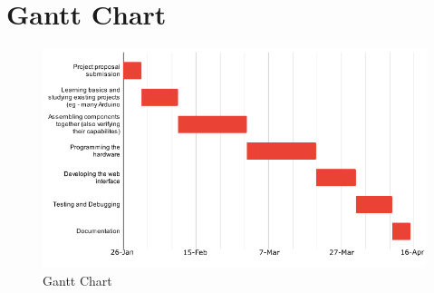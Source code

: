 \documentclass[12pt]{article}
\begin{document}
\section*{Gantt Chart}
 \begin{figure}[H]
    \includegraphics[scale=0.84]{Gantt4.png}
    \caption{Gantt Chart}
    \label{fig:my_label}
\end{figure}

\vspace{3cm}
\end{document}

